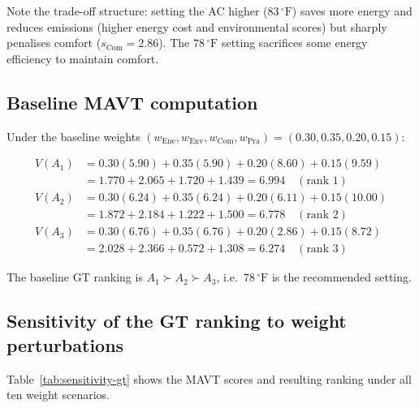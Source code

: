 \documentclass[11pt]{article}
\begin{document}
Note the trade-off structure: setting the AC higher ($83\,^{\circ}\text{F}$)
saves more energy and reduces emissions (higher energy cost and environmental
scores) but sharply penalises comfort ($s_{\text{Com}} = 2.86$).
The $78\,^{\circ}\text{F}$ setting sacrifices some energy efficiency to
maintain comfort.

\subsection{Baseline MAVT computation}

Under the baseline weights $(w_{\text{Ene}}, w_{\text{Env}},
w_{\text{Com}}, w_{\text{Pra}}) = (0.30, 0.35, 0.20, 0.15)$:

\begin{align}
  V(A_1) &= 0.30(5.90) + 0.35(5.90) + 0.20(8.60) + 0.15(9.59) \nonumber\\
         &= 1.770 + 2.065 + 1.720 + 1.439 = \mathbf{6.994} \quad (\text{rank } 1) \label{eq:a1} \\[4pt]
  V(A_2) &= 0.30(6.24) + 0.35(6.24) + 0.20(6.11) + 0.15(10.00) \nonumber\\
         &= 1.872 + 2.184 + 1.222 + 1.500 = \mathbf{6.778} \quad (\text{rank } 2) \label{eq:a2} \\[4pt]
  V(A_3) &= 0.30(6.76) + 0.35(6.76) + 0.20(2.86) + 0.15(8.72) \nonumber\\
         &= 2.028 + 2.366 + 0.572 + 1.308 = \mathbf{6.274} \quad (\text{rank } 3) \label{eq:a3}
\end{align}

The baseline GT ranking is $A_1 \succ A_2 \succ A_3$, i.e.\
$78\,^{\circ}\text{F}$ is the recommended setting.

\subsection{Sensitivity of the GT ranking to weight perturbations}

Table~\ref{tab:sensitivity-gt} shows the MAVT scores and resulting ranking
under all ten weight scenarios.
\end{document}
